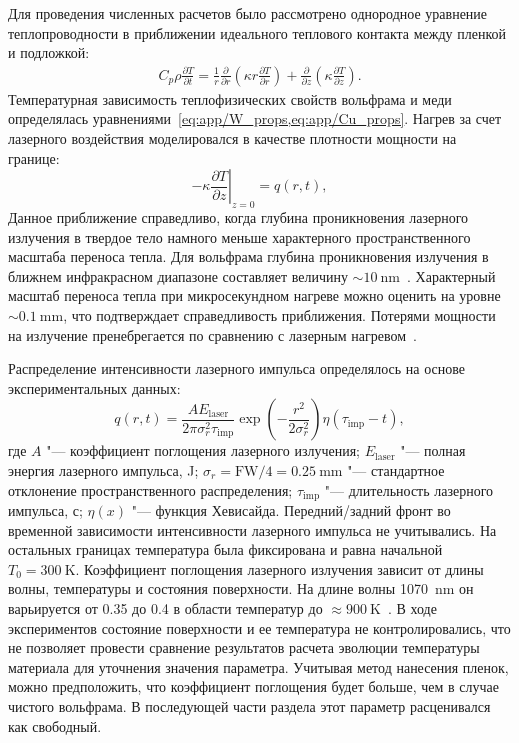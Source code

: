 Для проведения численных расчетов было рассмотрено однородное уравнение теплопроводности в приближении идеального теплового контакта между пленкой и подложкой:
\begin{align}
    C_p \rho \frac{\partial T}{\partial t} = \frac{1}{r}\frac{\partial}{\partial r}\left( \kappa r \frac{\partial T}{\partial r} \right) + \frac{\partial }{\partial z}\left( \kappa \frac{\partial T}{\partial z} \right).
\end{align}
Температурная зависимость теплофизических свойств вольфрама и меди определялась уравнениями~\cref{eq:app/W_props,eq:app/Cu_props}. Нагрев за счет лазерного воздействия моделировался в качестве плотности мощности на границе:
\begin{equation}
    -\kappa \left. \frac{\partial T}{\partial z} \right\vert_{z=0} = q(r, t),
\end{equation}
Данное приближение справедливо, когда глубина проникновения лазерного излучения в твердое тело намного меньше характерного пространственного масштаба переноса тепла. Для вольфрама глубина проникновения излучения в ближнем инфракрасном диапазоне составляет величину \( \sim \SI{10}{\nano\meter} \)~\cite{Ordal1988}. Характерный масштаб переноса тепла при микросекундном нагреве можно оценить на уровне \( \sim \SI{0.1}{\milli\meter} \), что подтверждает справедливость приближения. Потерями мощности на излучение пренебрегается по сравнению с лазерным нагревом~\cite{Stepanenko2024}.

Распределение интенсивности лазерного импульса определялось на основе экспериментальных данных:
\begin{equation}
    q(r,t)=\frac{A E_\mathrm{laser}}{2\pi \sigma_{r}^2\tau_\mathrm{imp}} \exp \left( -\frac{r^2}{2 \sigma_r^2} \right) \eta \left( \tau_\mathrm{imp}-t \right),
\end{equation}
где \(A \) "--- коэффициент поглощения лазерного излучения; $E_\mathrm{laser}$ "--- полная энергия лазерного импульса, \si{\joule}; $\sigma_r=\mathrm{FW}/4=\SI{0.25}{\milli\meter}$ "--- стандартное отклонение пространственного распределения; \( \tau_\mathrm{imp} \) "--- длительность лазерного импульса, с; \(\eta(x)\) "--- функция Хевисайда. Передний/задний фронт во временной зависимости интенсивности лазерного импульса не учитывались. На остальных границах температура была фиксирована и равна начальной \(T_0=\SI{300}{\kelvin}\). Коэффициент поглощения лазерного излучения зависит от длины волны, температуры и состояния поверхности. На длине волны \SI{1070}{\nano\meter} он варьируется от \num{0.35} до \num{0.4} в области температур до \( \approx \SI{900}{\kelvin} \)~\cite{Minissale2017}. В ходе экспериментов состояние поверхности и ее температура не контролировались, что не позволяет провести сравнение результатов расчета эволюции температуры материала для уточнения значения параметра. Учитывая метод нанесения пленок, можно предположить, что коэффициент поглощения будет больше, чем в случае чистого вольфрама. В последующей части раздела этот параметр расценивался как свободный.

